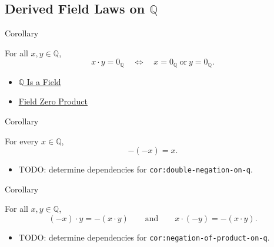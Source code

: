 \subsection*{Derived Field Laws on $\mathbb{Q}$}

\begin{corollarybox}{Corollary}
\begin{corollary}
\label{cor:zero-product-on-q}
For all $x,y\in\mathbb{Q}$,
\[
x\cdot y=0_{\mathbb{Q}}
\quad\Longleftrightarrow\quad
x=0_{\mathbb{Q}}\ \text{or}\ y=0_{\mathbb{Q}}.
\]
\end{corollary}
\end{corollarybox}

\begin{dependencies}
\begin{itemize}
  \item \hyperref[thm:q-is-a-field]{$\mathbb{Q}$ Is a Field}
  \item \hyperref[thm:field-zero-product]{Field Zero Product}
\end{itemize}
\end{dependencies}

\begin{corollarybox}{Corollary}
\begin{corollary}
\label{cor:double-negation-on-q}
For every $x\in\mathbb{Q}$,
\[
-(-x)=x.
\]
\end{corollary}
\end{corollarybox}

\begin{dependencies}
\begin{itemize}
  \item TODO: determine dependencies for \texttt{cor:double-negation-on-q}.
\end{itemize}
\end{dependencies}

\begin{corollarybox}{Corollary}
\begin{corollary}
\label{cor:negation-of-product-on-q}
For all $x,y\in\mathbb{Q}$,
\[
(-x)\cdot y=-(x\cdot y)
\qquad\text{and}\qquad
x\cdot(-y)=-(x\cdot y).
\]
\end{corollary}
\end{corollarybox}

\begin{dependencies}
\begin{itemize}
  \item TODO: determine dependencies for \texttt{cor:negation-of-product-on-q}.
\end{itemize}
\end{dependencies}


